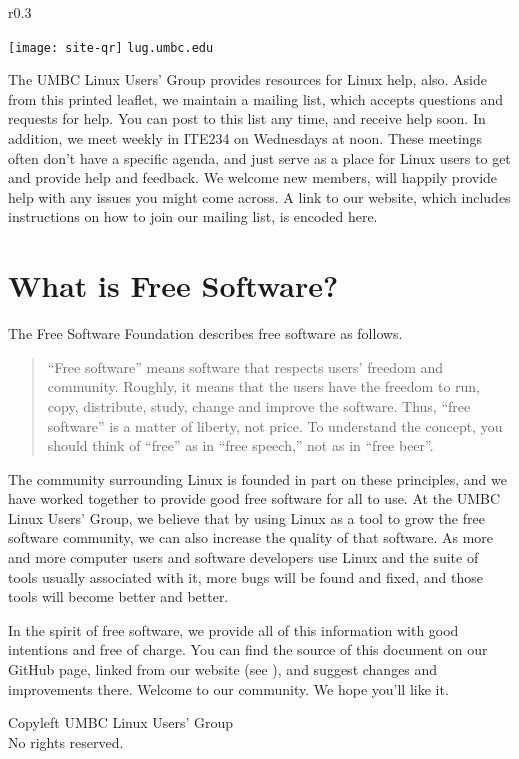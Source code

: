 \documentclass[11pt,notumble]{leaflet}
\begin{document}
\begin{wrapfigure}{r}{0.3\textwidth}
    \vspace{-3em}
    \begin{center}
        \texttt{[image: site-qr]}
        \vspace{-2em}
        \texttt{lug.umbc.edu}
    \end{center}
\end{wrapfigure}

The UMBC Linux Users' Group provides resources for Linux help, also. Aside from
this printed leaflet, we maintain a mailing list, which accepts questions and
requests for help. You can post to this list any time, and receive help soon. In
addition, we meet weekly in ITE234 on Wednesdays at noon. These meetings often
don't have a specific agenda, and just serve as a place for Linux users to get
and provide help and feedback. We welcome new members, will happily provide help
with any issues you might come across. A link to our website, which includes
instructions on how to join our mailing list, is encoded here.

\section{What is Free Software?}
\label{section:free-software}

The Free Software Foundation describes free software as follows.

\begin{quote}
    “Free software” means software that respects users' freedom and community.
    Roughly, it means that the users have the freedom to run, copy, distribute,
    study, change and improve the software. Thus, “free software” is a matter of
    liberty, not price. To understand the concept, you should think of “free” as
    in “free speech,” not as in “free beer”.
\end{quote}

The community surrounding Linux is founded in part on these principles, and we
have worked together to provide good free software for all to use. At the UMBC
Linux Users' Group, we believe that by using Linux as a tool to grow the free
software community, we can also increase the quality of that software. As more
and more computer users and software developers use Linux and the suite of tools
usually associated with it, more bugs will be found and fixed, and those tools
will become better and better.

In the spirit of free software, we provide all of this information with good
intentions and free of charge. You can find the source of this document on our
GitHub page, linked from our website (see ), and
suggest changes and improvements there. Welcome to our community. We hope you'll
like it.

\vfill
\begin{center} \small 
    \textcopyleft{} Copyleft \the\year{} UMBC Linux Users' Group \\
    No rights reserved.
\end{center}
\end{document}

